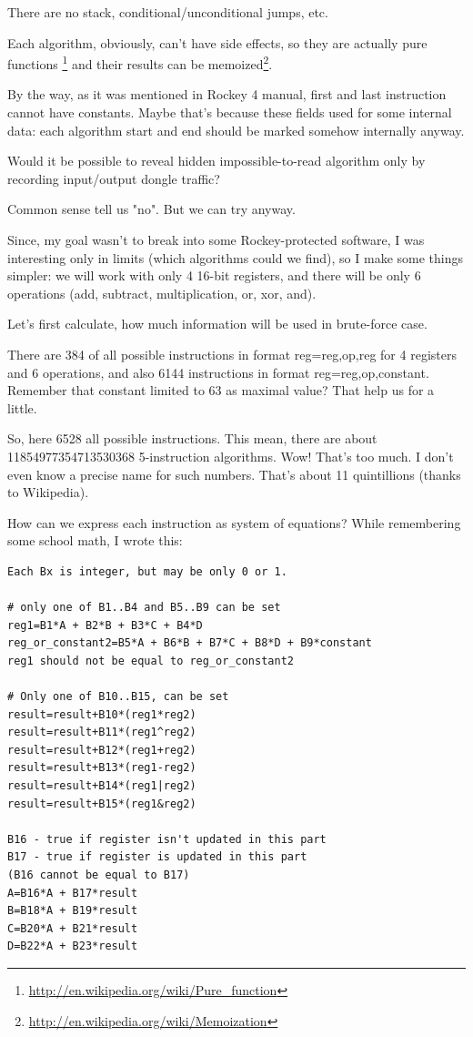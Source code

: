 There are no stack, conditional/unconditional jumps, etc.

Each algorithm, obviously, can't have side effects, so they are actually pure functions
\footnote{\url{http://en.wikipedia.org/wiki/Pure_function}} and their results can be 
memoized\footnote{\url{http://en.wikipedia.org/wiki/Memoization}}.

By the way, as it was mentioned in Rockey 4 manual, first and last instruction cannot have constants. Maybe that's because these fields used for some internal data: each algorithm start and end should be marked somehow internally anyway.

Would it be possible to reveal hidden impossible-to-read algorithm only by recording input/output dongle traffic?

Common sense tell us "no". But we can try anyway.

Since, my goal wasn't to break into some Rockey-protected software, I was interesting only in limits (which algorithms could we find), so I make some things simpler: we will work with only 4 16-bit registers, and there will be only 6 operations (add, subtract, multiplication, or, xor, and).

Let's first calculate, how much information will be used in brute-force case.

There are 384 of all possible instructions in format reg=reg,op,reg for 4 registers and 6 operations, and also 6144 instructions in format reg=reg,op,constant. Remember that constant limited to 63 as maximal value? That help us for a little.

So, here 6528 all possible instructions. This mean, there are about 11854977354713530368 5-instruction algorithms. Wow! That's too much. I don't even know a precise name for such numbers. That's about 11 quintillions (thanks to Wikipedia).

How can we express each instruction as system of equations? While remembering some school math, I wrote this:


\begin{lstlisting}
Each Bx is integer, but may be only 0 or 1.

# only one of B1..B4 and B5..B9 can be set
reg1=B1*A + B2*B + B3*C + B4*D
reg_or_constant2=B5*A + B6*B + B7*C + B8*D + B9*constant
reg1 should not be equal to reg_or_constant2

# Only one of B10..B15, can be set
result=result+B10*(reg1*reg2)
result=result+B11*(reg1^reg2)
result=result+B12*(reg1+reg2)
result=result+B13*(reg1-reg2)
result=result+B14*(reg1|reg2)
result=result+B15*(reg1&reg2)

B16 - true if register isn't updated in this part
B17 - true if register is updated in this part
(B16 cannot be equal to B17)
A=B16*A + B17*result
B=B18*A + B19*result
C=B20*A + B21*result
D=B22*A + B23*result
\end{lstlisting}

